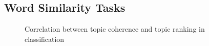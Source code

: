 \subsection{Word Similarity Tasks}

\begin{figure}[h!t!b!]
  \centering
  \caption{Correlation between topic coherence and topic ranking in
  classification}
  \label{fig:topic-ranks}
\end{figure}

